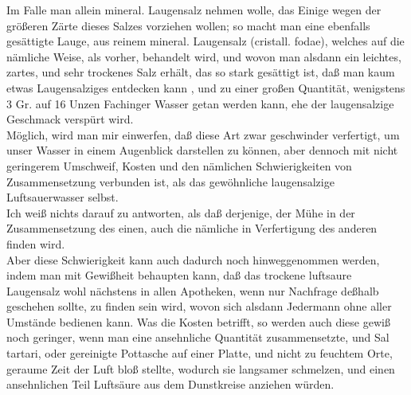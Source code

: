 \documentclass[11pt,a5paper,twoside]{memoir}
\begin{document}
Im Falle man allein mineral. Laugensalz nehmen wolle,
das Einige wegen der größeren Zärte dieses Salzes vorziehen wollen;
so macht man eine ebenfalls gesättigte Lauge,
aus reinem mineral. Laugensalz ({\lattext cristall. fodae}),
welches auf die nämliche Weise, als vorher, behandelt wird,
und wovon man alsdann ein leichtes, zartes,
und sehr trockenes Salz erhält, das so stark gesättigt ist,
daß man kaum etwas Laugensalziges entdecken kann%
,
und zu einer großen Quantität,
wenigstens 3 Gr. auf 16 Unzen Fachinger Wasser getan werden kann,
ehe der laugensalzige Geschmack verspürt wird.\\

Möglich, wird man mir einwerfen,
daß diese Art zwar geschwinder verfertigt,
um unser Wasser in einem Augenblick darstellen zu können,
aber dennoch mit nicht geringerem Umschweif,
Kosten und den nämlichen Schwierigkeiten von Zusammensetzung verbunden ist,
als das gewöhnliche laugensalzige Luftsauerwasser selbst.\\

Ich weiß nichts darauf zu antworten,
als daß derjenige, der Mühe in der Zusammensetzung des einen,
auch die nämliche in Verfertigung des anderen finden wird.\\

Aber diese Schwierigkeit kann auch dadurch noch hinweggenommen werden,
indem man mit Gewißheit behaupten kann,
daß das trockene luftsaure Laugensalz wohl nächstens in allen Apotheken,
wenn nur Nachfrage deßhalb geschehen sollte,
zu finden sein wird,
wovon sich alsdann Jedermann ohne aller Umstände bedienen kann.
Was die Kosten betrifft,
so werden auch diese gewiß noch geringer,
wenn man eine ansehnliche Quantität zusammensetzte,%
und {\lattext Sal tartari},
oder gereinigte Pottasche auf einer Platte,
und nicht zu feuchtem Orte,
geraume Zeit der Luft bloß stellte,
wodurch sie langsamer schmelzen,
und einen ansehnlichen Teil Luftsäure aus dem Dunstkreise anziehen würden.
\end{document}

